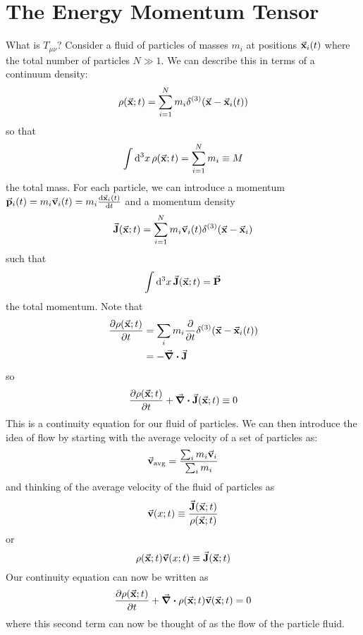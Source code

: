 \documentclass[a4paper,twoside,master.tex]{subfiles}
\begin{document}
\section{The Energy Momentum Tensor}\label{sec:the_energy_momentum_tensor}

What is $ T_{\mu \nu} $? Consider a fluid of particles of masses $ m_i $ at positions $ \va{x}_i(t) $ where the total number of particles $ N \gg 1 $. We can describe this in terms of a continuum density:
\begin{equation}
    \rho(\va{x};t) = \sum_{i=1}^{N} m_i \delta^{(3)}(\va{x} - \va{x}_i(t))
\end{equation}
so that
\begin{equation}
    \int \dd[3]{x} \rho(\va{x};t) = \sum_{i=1}^{N} m_i \equiv M
\end{equation}
the total mass. For each particle, we can introduce a momentum $ \va{p}_i(t) = m_i \va{v}_i(t) = m_i \dv{\va{x}_i(t)}{t} $ and a momentum density
\begin{equation}
    \va{J}(\va{x};t) = \sum_{i=1}^{N} m_i \va{v}_i(t) \delta^{(3)}(\va{x} - \va{x}_i)
\end{equation}
such that
\begin{equation}
    \int \dd[3]{x} \va{J}(\va{x};t) = \va{P}
\end{equation}
the total momentum. Note that
\begin{align}
    \pdv{\rho(\va{x};t)}{t} &= \sum_i m_i \pdv{t}\delta^{(3)}(\va{x} - \va{x}_i(t)) \\
                            &= - \div{\va{J}}
\end{align}
so
\begin{equation}
    \pdv{\rho(\va{x};t)}{t} + \div{\va{J}(\va{x};t)} \equiv 0
\end{equation}
This is a continuity equation for our fluid of particles. We can then introduce the idea of flow by starting with the average velocity of a set of particles as:
\begin{equation}
    \va{v}_{\text{avg}} = \frac{\sum_i m_i \va{v}_i}{\sum_i m_i}
\end{equation}
and thinking of the average velocity of the fluid of particles as
\begin{equation}
    \va{v}(x;t) \equiv \frac{\va{J}(\va{x};t)}{\rho(\va{x};t)}
\end{equation}
or
\begin{equation}
    \rho(\va{x};t) \va{v}(x;t) \equiv \va{J}(\va{x};t)
\end{equation}
Our continuity equation can now be written as
\begin{equation}
    \pdv{\rho(\va{x};t)}{t} + \div{\rho(\va{x};t) \va{v}(\va{x};t)} = 0
\end{equation}
where this second term can now be thought of as the flow of the particle fluid.
\end{document}

